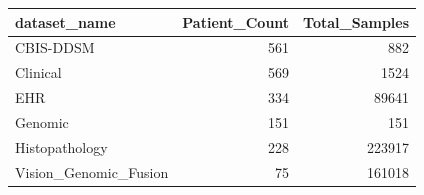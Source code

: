 \begin{tabular}{lrr}
\toprule
dataset\_name & Patient\_Count & Total\_Samples \\
\midrule
CBIS-DDSM & 561 & 882 \\
Clinical & 569 & 1524 \\
EHR & 334 & 89641 \\
Genomic & 151 & 151 \\
Histopathology & 228 & 223917 \\
Vision\_Genomic\_Fusion & 75 & 161018 \\
\bottomrule
\end{tabular}

